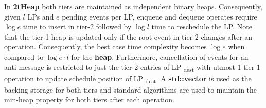 In \textbf{2tHeap} both tiers are maintained as independent binary heaps. Consequently, given $l$ LPs and $e$ pending events per LP, enqueue and dequeue operates require
$\log e$ time to insert in tier-2 followed by $\log l$ time to reschedule the LP. Note that the tier-1 heap is updated only if the root event in tier-2 changes after an operation. Consequently, the best case time complexity becomes $\log e$ when compared to $\log e\cdot l$ for the \textbf{heap}. Furthermore, cancellation of events for an anti-message is restricted to just the tier-2 entries of LP \textsubscript{dest}  with utmost 1 tier-1 operation to update schedule position of LP \textsubscript{dest}. A \textbf{std::vector} is used as the backing storage for both tiers and standard algorithms are used to maintain the min-heap property for both tiers after each operation.

